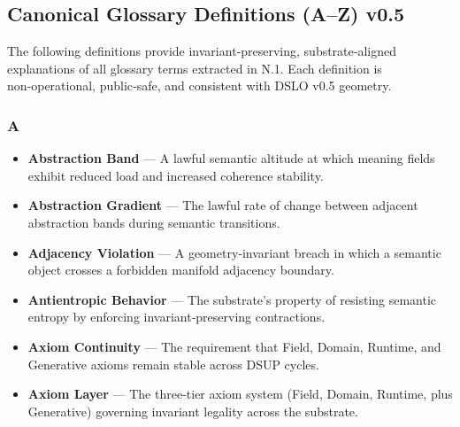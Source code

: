 \subsection*{Canonical Glossary Definitions (A–Z) v0.5}

The following definitions provide invariant‑preserving, substrate‑aligned
explanations of all glossary terms extracted in N.1. Each definition is
non‑operational, public‑safe, and consistent with DSLO v0.5 geometry.


\subsubsection*{A}
\begin{itemize}
    \item \textbf{Abstraction Band} — A lawful semantic altitude at which meaning
    fields exhibit reduced load and increased coherence stability.

    \item \textbf{Abstraction Gradient} — The lawful rate of change between adjacent abstraction bands during semantic transitions.

    \item \textbf{Adjacency Violation} — A geometry‑invariant breach in which a
    semantic object crosses a forbidden manifold adjacency boundary.

    \item \textbf{Antientropic Behavior} — The substrate’s property of resisting
    semantic entropy by enforcing invariant‑preserving contractions.

    \item \textbf{Axiom Continuity} — The requirement that Field, Domain, Runtime, and Generative axioms remain stable across DSUP cycles.

    \item \textbf{Axiom Layer} — The three‑tier axiom system (Field, Domain,
    Runtime, plus Generative) governing invariant legality across the substrate.
\end{itemize}


